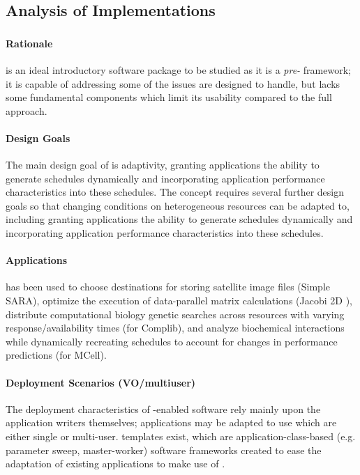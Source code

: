 \documentclass{sig-alternate}
\begin{document}
\subsection{Analysis of \pilotjob Implementations}


%
\subsubsection{\apples}
\paragraph{Rationale}
\apples is an ideal introductory software package to be studied
as it is a \textit{pre-\pilot} framework; it is capable of
addressing some of the issues \pilotjobs are designed to handle,
but lacks some fundamental components which limit its usability
compared to the full \pilotjob approach.

\paragraph{Design Goals}
The main design goal of \apples is adaptivity, granting applications 
the ability to generate schedules dynamically and incorporating
application performance characteristics into these schedules.
The concept requires several further
design goals so that changing conditions on heterogeneous
resources can be adapted to, including granting applications
the ability to generate schedules dynamically and incorporating
application performance characteristics into these schedules.

\paragraph{Applications}
\apples has been used to choose destinations
for storing satellite image files (Simple SARA), 
optimize the execution of data-parallel matrix
calculations (Jacobi 2D \apples), 
distribute computational biology genetic searches
across resources with varying response/availability times 
(\apples for Complib), and
analyze biochemical interactions while dynamically recreating
schedules to account for changes in performance predictions
(\apples for MCell).

\paragraph{Deployment Scenarios (VO/multiuser)}
The deployment characteristics of \apples-enabled software rely
mainly upon the application writers themselves; applications
may be adapted to use \apples which are either single or multi-user.
\apples templates exist, which are application-class-based (e.g.
parameter sweep, master-worker) 
software frameworks created
to ease the adaptation of existing applications to make use
of \apples.
\end{document}
